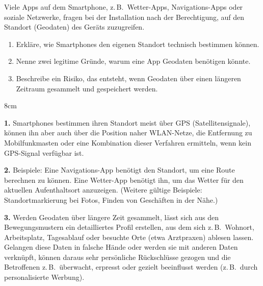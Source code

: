 \question[4]
Viele Apps auf dem Smartphone, z.\,B.\ Wetter-Apps, Navigations-Apps 
oder soziale Netzwerke, fragen bei der Installation nach der 
Berechtigung, auf den Standort (Geodaten) des Geräts zuzugreifen.

\begin{enumerate}
    \item Erkläre, wie Smartphones den eigenen Standort technisch 
    bestimmen können.
    \item Nenne zwei legitime Gründe, warum eine App Geodaten 
    benötigen könnte.
    \item Beschreibe ein Risiko, das entsteht, wenn Geodaten über 
    einen längeren Zeitraum gesammelt und gespeichert werden.
\end{enumerate}

\begin{solutionbox}{8cm}

\textbf{1.} Smartphones bestimmen ihren Standort meist über GPS 
(Satellitensignale), können ihn aber auch über die Position naher 
WLAN-Netze, die Entfernung zu Mobilfunkmasten oder eine Kombination 
dieser Verfahren ermitteln, wenn kein GPS-Signal verfügbar ist.

\textbf{2.} Beispiele: Eine Navigations-App benötigt den Standort, um 
eine Route berechnen zu können. Eine Wetter-App benötigt ihn, um das 
Wetter für den aktuellen Aufenthaltsort anzuzeigen. (Weitere gültige 
Beispiele: Standortmarkierung bei Fotos, Finden von Geschäften in der 
Nähe.)

\textbf{3.} Werden Geodaten über längere Zeit gesammelt, lässt sich 
aus den Bewegungsmustern ein detailliertes Profil erstellen, aus dem 
sich z.\,B.\ Wohnort, Arbeitsplatz, Tagesablauf oder besuchte Orte 
(etwa Arztpraxen) ablesen lassen. Gelangen diese Daten in falsche 
Hände oder werden sie mit anderen Daten verknüpft, können daraus 
sehr persönliche Rückschlüsse gezogen und die Betroffenen z.\,B.\ 
überwacht, erpresst oder gezielt beeinflusst werden (z.\,B.\ durch 
personalisierte Werbung).

\end{solutionbox}